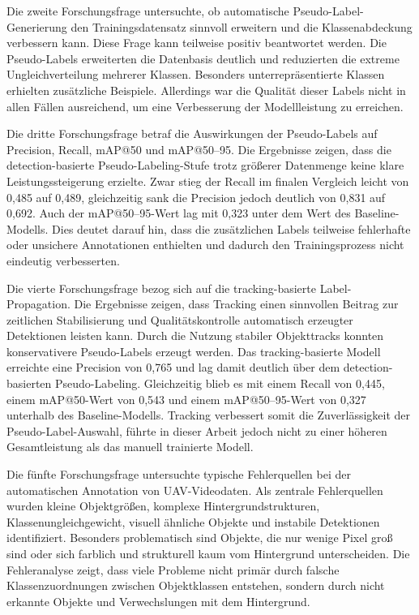 Die zweite Forschungsfrage untersuchte, ob automatische Pseudo-Label-Generierung
den Trainingsdatensatz sinnvoll erweitern und die Klassenabdeckung verbessern
kann. Diese Frage kann teilweise positiv beantwortet werden. Die Pseudo-Labels
erweiterten die Datenbasis deutlich und reduzierten die extreme Ungleichverteilung
mehrerer Klassen. Besonders unterrepräsentierte Klassen erhielten zusätzliche
Beispiele. Allerdings war die Qualität dieser Labels nicht in allen Fällen
ausreichend, um eine Verbesserung der Modellleistung zu erreichen.

Die dritte Forschungsfrage betraf die Auswirkungen der Pseudo-Labels auf
Precision, Recall, mAP@50 und mAP@50--95. Die Ergebnisse zeigen, dass die
detection-basierte Pseudo-Labeling-Stufe trotz größerer Datenmenge keine klare
Leistungssteigerung erzielte. Zwar stieg der Recall im finalen Vergleich leicht von
0{,}485 auf 0{,}489, gleichzeitig sank die Precision jedoch deutlich von 0{,}831
auf 0{,}692. Auch der mAP@50--95-Wert lag mit 0{,}323 unter dem Wert des
Baseline-Modells. Dies deutet darauf hin, dass die zusätzlichen Labels teilweise
fehlerhafte oder unsichere Annotationen enthielten und dadurch den Trainingsprozess
nicht eindeutig verbesserten.

Die vierte Forschungsfrage bezog sich auf die tracking-basierte Label-Propagation.
Die Ergebnisse zeigen, dass Tracking einen sinnvollen Beitrag zur zeitlichen
Stabilisierung und Qualitätskontrolle automatisch erzeugter Detektionen leisten
kann. Durch die Nutzung stabiler Objekttracks konnten konservativere
Pseudo-Labels erzeugt werden. Das tracking-basierte Modell erreichte eine
Precision von 0{,}765 und lag damit deutlich über dem detection-basierten
Pseudo-Labeling. Gleichzeitig blieb es mit einem Recall von 0{,}445, einem
mAP@50-Wert von 0{,}543 und einem mAP@50--95-Wert von 0{,}327 unterhalb
des Baseline-Modells. Tracking verbessert somit die Zuverlässigkeit der
Pseudo-Label-Auswahl, führte in dieser Arbeit jedoch nicht zu einer höheren
Gesamtleistung als das manuell trainierte Modell.

Die fünfte Forschungsfrage untersuchte typische Fehlerquellen bei der
automatischen Annotation von UAV-Videodaten. Als zentrale Fehlerquellen wurden
kleine Objektgrößen, komplexe Hintergrundstrukturen, Klassenungleichgewicht,
visuell ähnliche Objekte und instabile Detektionen identifiziert. Besonders
problematisch sind Objekte, die nur wenige Pixel groß sind oder sich farblich und
strukturell kaum vom Hintergrund unterscheiden. Die Fehleranalyse zeigt, dass
viele Probleme nicht primär durch falsche Klassenzuordnungen zwischen
Objektklassen entstehen, sondern durch nicht erkannte Objekte und Verwechslungen
mit dem Hintergrund.

